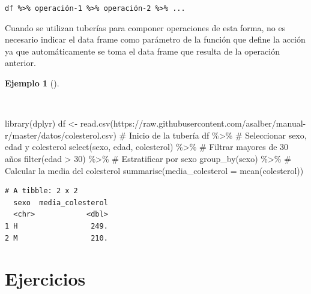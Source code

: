 \documentclass[
  a4paper,
]{scrreport}
\newenvironment{Shaded}{\begin{snugshade}}{\end{snugshade}}
\newcommand{\AttributeTok}[1]{\textcolor[rgb]{0.40,0.45,0.13}{#1}}
\newcommand{\CommentTok}[1]{\textcolor[rgb]{0.37,0.37,0.37}{#1}}
\newcommand{\DecValTok}[1]{\textcolor[rgb]{0.68,0.00,0.00}{#1}}
\newcommand{\FunctionTok}[1]{\textcolor[rgb]{0.28,0.35,0.67}{#1}}
\newcommand{\NormalTok}[1]{\textcolor[rgb]{0.00,0.23,0.31}{#1}}
\newcommand{\OtherTok}[1]{\textcolor[rgb]{0.00,0.23,0.31}{#1}}
\newcommand{\SpecialCharTok}[1]{\textcolor[rgb]{0.37,0.37,0.37}{#1}}
\newcommand{\StringTok}[1]{\textcolor[rgb]{0.13,0.47,0.30}{#1}}
\theoremstyle{definition}
\theoremstyle{definition}
\newtheorem{example}{Ejemplo}[chapter]
\theoremstyle{remark}
\begin{document}
\texttt{df\ \%\textgreater{}\%\ operación-1\ \%\textgreater{}\%\ operación-2\ \%\textgreater{}\%\ ...}

Cuando se utilizan tuberías para componer operaciones de esta forma, no
es necesario indicar el data frame como parámetro de la función que
define la acción ya que automáticamente se toma el data frame que
resulta de la operación anterior.

\begin{example}[]\protect\hypertarget{exm-tuberías-1}{}\label{exm-tuberías-1}

~

\begin{Shaded}
\begin{Highlighting}[]
\FunctionTok{library}\NormalTok{(dplyr)}
\NormalTok{df }\OtherTok{\textless{}{-}} \FunctionTok{read.csv}\NormalTok{(}\StringTok{\textquotesingle{}https://raw.githubusercontent.com/asalber/manual{-}r/master/datos/colesterol.csv\textquotesingle{}}\NormalTok{)}
\CommentTok{\# Inicio de la tubería}
\NormalTok{df }\SpecialCharTok{\%\textgreater{}\%} 
    \CommentTok{\# Seleccionar sexo, edad y colesterol}
    \FunctionTok{select}\NormalTok{(sexo, edad, colesterol) }\SpecialCharTok{\%\textgreater{}\%}
    \CommentTok{\# Filtrar mayores de 30 años}
    \FunctionTok{filter}\NormalTok{(edad }\SpecialCharTok{\textgreater{}} \DecValTok{30}\NormalTok{) }\SpecialCharTok{\%\textgreater{}\%}
    \CommentTok{\# Estratificar por sexo}
    \FunctionTok{group\_by}\NormalTok{(sexo) }\SpecialCharTok{\%\textgreater{}\%}
    \CommentTok{\# Calcular la media del colesterol}
    \FunctionTok{summarise}\NormalTok{(}\AttributeTok{media\_colesterol =} \FunctionTok{mean}\NormalTok{(colesterol))}
\end{Highlighting}
\end{Shaded}

\begin{verbatim}
# A tibble: 2 x 2
  sexo  media_colesterol
  <chr>            <dbl>
1 H                 249.
2 M                 210.
\end{verbatim}

\end{example}

\section{Ejercicios}\label{ejercicios-4}
\end{document}
